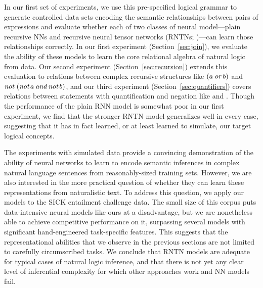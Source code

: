 In our first set of experiments, we use this pre-specified logical
grammar to generate controlled data sets encoding the semantic
relationships between pairs of expressions and evaluate whether each
of two classes of neural model---plain recursive NNs and recursive neural
tensor networks (RNTNs; \citealt{socher2013acl1})---can learn those
relationships correctly. In our first experiment
(Section~\ref{sec:join}), we evaluate the ability of these models to
learn the core relational algebra of natural logic from data. Our
second experiment (Section~\ref{sec:recursion}) extends this
evaluation to relations between complex recursive structures like
$(a \mathbin{\textit{or}} b)$ and $\mathop{\textit{not}}~(\mathop{\textit{not}} a \mathbin{\textit{and}} \mathop{\textit{not}} b)$, and our third
experiment (Section~\ref{sec:quantifiers}) covers relations between
statements with quantification and negation like  and . Though the performance of the plain RNN model 
 is somewhat poor in our first experiment, we find that the stronger RNTN model
  generalizes well in every case, suggesting that it has in fact learned, or at least
 learned to simulate, our target logical concepts.

The experiments with simulated data provide a convincing demonstration
of the ability of neural networks to learn to encode semantic
inferences in complex natural language sentences from reasonably-sized
training sets. However, we are also interested in the more practical
question of whether they can learn these representations from
naturalistic text. To address this question, we apply our models to
the SICK entailment challenge data. The small size of this corpus puts
data-intensive neural models like ours at a disadvantage, but we are
nonetheless able to achieve competitive performance on it,
surpassing several models with significant hand-engineered task-specific features.
This suggests that the representational abilities that we observe in the previous sections
are not limited to carefully circumscribed tasks. We conclude that RNTN models
are adequate for typical cases of natural logic inference, and that there is not yet
any clear level of inferential complexity for which other approaches work and NN models fail.


